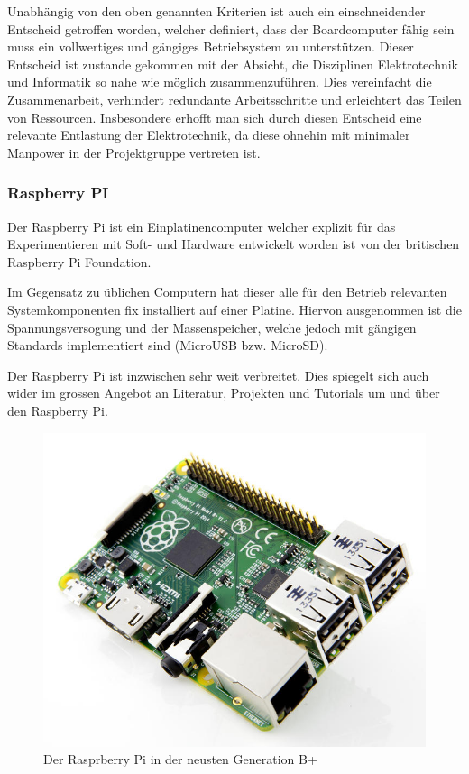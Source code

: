 Unabhängig von den oben genannten Kriterien ist auch ein einschneidender
Entscheid getroffen worden, welcher definiert, dass der Boardcomputer
fähig sein muss ein vollwertiges und gängiges Betriebsystem zu 
unterstützen. Dieser Entscheid ist zustande gekommen mit der Absicht, die
Disziplinen Elektrotechnik und Informatik so nahe wie möglich 
zusammenzuführen. Dies vereinfacht die Zusammenarbeit, verhindert 
redundante Arbeitsschritte und erleichtert das Teilen von Ressourcen.
Insbesondere erhofft man sich durch diesen Entscheid eine relevante 
Entlastung der Elektrotechnik, da diese ohnehin mit minimaler Manpower in
der Projektgruppe vertreten ist.

\subsubsection{Raspberry PI}
Der Raspberry Pi ist ein Einplatinencomputer welcher explizit für
das Experimentieren mit Soft- und Hardware entwickelt worden ist von
der britischen Raspberry Pi Foundation.

Im Gegensatz zu üblichen Computern hat dieser alle für den Betrieb
relevanten Systemkomponenten fix installiert auf einer Platine. Hiervon
ausgenommen ist die Spannungsversogung und der Massenspeicher, welche
jedoch mit gängigen Standards implementiert sind (MicroUSB bzw. MicroSD).

Der Raspberry Pi ist inzwischen sehr weit verbreitet. Dies spiegelt sich
auch wider im grossen Angebot an Literatur, Projekten und Tutorials um
und über den Raspberry Pi.

\begin{figure}[h!]
	\centering
	\includegraphics[scale=1]{../../fig/raspberry-pi-b-plus.jpg}
	\caption{Der Rasprberry Pi in der neusten Generation B+}
\end{figure}

